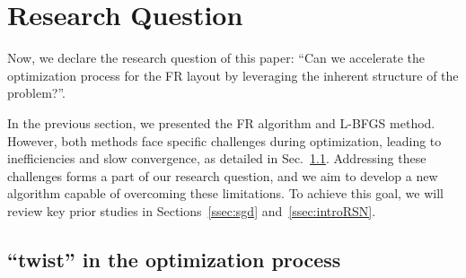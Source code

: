 \documentclass[dvipdfmx,journal]{IEEEtran}
\begin{document}
\section{Research Question}\label{sec:RQ}

Now, we declare the research question of this paper: ``Can we accelerate the optimization process for the FR layout by leveraging the inherent structure of the problem?''.

In the previous section, we presented the FR algorithm and L-BFGS method. However, both methods face specific challenges during optimization, leading to inefficiencies and slow convergence, as detailed in Sec.~\ref{ssec:twist}.
Addressing these challenges forms a part of our research question, and we aim to develop a new algorithm capable of overcoming these limitations. To achieve this goal, we will review key prior studies in Sections~\ref{ssec:sgd} and~\ref{ssec:introRSN}.

\subsection{``twist'' in the optimization process}\label{ssec:twist}
\end{document}
